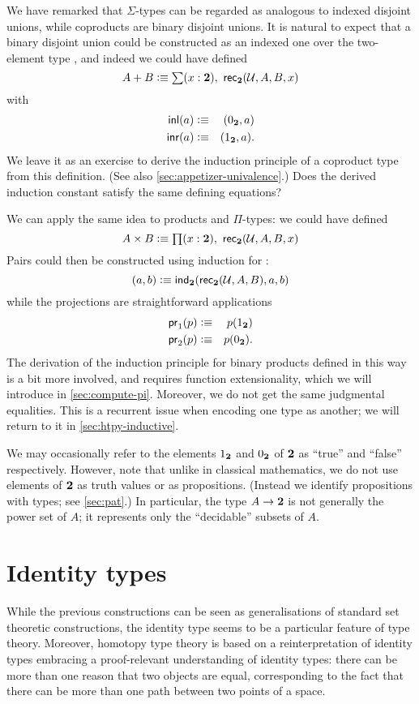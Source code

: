 We have remarked that $\Sigma$-types can be regarded as analogous to indexed disjoint unions, while coproducts are binary disjoint unions.
It is natural to expect that a binary disjoint union could be constructed as an indexed one over the two-element type \bool, and indeed we could have defined
\[ A + B \defeq \sm{x:\bool} \rec{\bool}(\UU,A,B,x) \]
with
\begin{eqnarray*}
  {\mathsf{inl}}(a) & \vcentcolon\equiv & ( {0_{\mathbf{2}}},a) \\
  {\mathsf{inr}}(a) & \vcentcolon\equiv & ( {1_{\mathbf{2}}},a).
\end{eqnarray*}
We leave it as an exercise to derive the induction principle of a coproduct type from this definition.
(See also \autoref{sec:appetizer-univalence}.)
Does the derived
induction constant satisfy the same defining equations?

We can apply the same idea to products and $\Pi$-types: we could have defined
\[ A \times B \defeq \prd{x:\bool}\rec{\bool}(\UU,A,B,x) \]
Pairs could then be constructed using induction for \bool:
\[ ( a,b) \vcentcolon\equiv \mathsf{ind}_{\mathbf{2}}(\mathsf{rec}_{\mathbf{2}}(\mathcal{U},A,B),a,b) \]
while the projections are straightforward applications
\begin{eqnarray*}
  \mathsf{pr}_{1}(p) & \vcentcolon\equiv & p({1_{\mathbf{2}}}) \\
  \mathsf{pr}_{2}(p) & \vcentcolon\equiv & p({0_{\mathbf{2}}}).
\end{eqnarray*}
The derivation of the induction principle for binary products defined in this way is a bit more involved, and requires function extensionality, which we will introduce in \autoref{sec:compute-pi}.
Moreover, we do not get the same judgmental equalities.
This is a recurrent issue when encoding one type as another; we will return to it in \autoref{sec:htpy-inductive}. 

We may occasionally refer to the elements ${1_{\mathbf{2}}}$ and ${0_{\mathbf{2}}}$ of $\mathbf{2}$ as ``true'' and ``false'' respectively.
However, note that unlike in classical mathematics, we do not use elements of $\mathbf{2}$ as truth values or as propositions.
(Instead we identify propositions with types; see \autoref{sec:pat}.)
In particular, the type $A \to \mathbf{2}$ is not generally the power set of $A$; it represents only the ``decidable'' subsets of $A$.


\section{Identity types}
\label{sec:identity-types}

While the previous constructions can be seen as generalisations of
standard set theoretic constructions, the identity type seems to be
a particular feature of type theory. Moreover, homotopy type theory is
based on a reinterpretation of identity types embracing a
proof-relevant understanding of identity types: there can be more than
one reason that two objects are equal, corresponding to the fact that
there can be more than one path between two points of a space.

